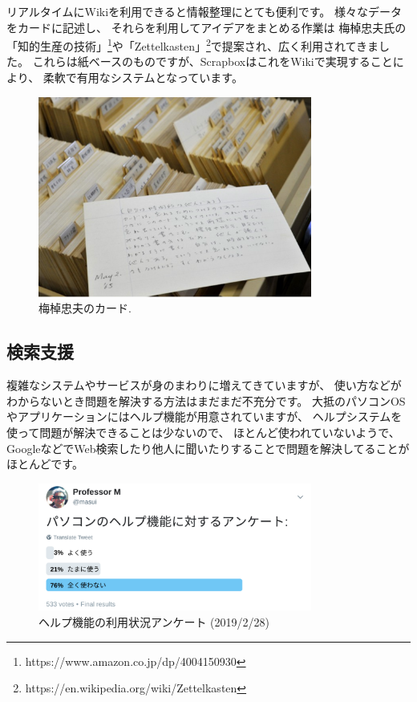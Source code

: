 \documentclass[topics]{compsoft} %
\begin{document}
リアルタイムにWikiを利用できると情報整理にとても便利です。
様々なデータをカードに記述し、
それらを利用してアイデアをまとめる作業は
梅棹忠夫氏の「知的生産の技術」\footnote{
  \textsf{https:{\slash}{\slash}www.amazon.co.jp{\slash}dp{\slash}4004150930}
}や「Zettelkasten」\footnote{
  \textsf{https:{\slash}{\slash}en.wikipedia.org{\slash}wiki{\slash}Zettelkasten}
}で提案され、広く利用されてきました。
これらは紙ベースのものですが、ScrapboxはこれをWikiで実現することにより、
柔軟で有用なシステムとなっています。

\begin{figure}[t]
  \includegraphics[width=9cm,bb=0 0 1204 882]{figures/1b2d14242e1eb302356a8f49c7450f04.png}
  \caption{梅棹忠夫のカード.}
  \label{umesaocards}
\end{figure}

\subsection{検索支援}

複雑なシステムやサービスが身のまわりに増えてきていますが、
使い方などがわからないとき問題を解決する方法はまだまだ不充分です。
大抵のパソコンOSやアプリケーションにはヘルプ機能が用意されていますが、
ヘルプシステムを使って問題が解決できることは少ないので、
ほとんど使われていないようで、
GoogleなどでWeb検索したり他人に聞いたりすることで問題を解決してることがほとんどです。

\begin{figure}[t]
  \includegraphics[width=9cm,bb=0 0 1332 623]{figures/383ee54c265ebbb88778d7ea0fbea5b1.png}
  \caption{ヘルプ機能の利用状況アンケート (2019/2/28)}
  \label{helpinquiry}
\end{figure}
\end{document}
